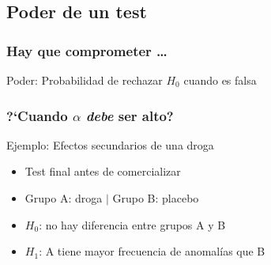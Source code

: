 \documentclass[mathserif]{beamer}
\begin{document}


\subsection[Poder]{Poder de un test}

\begin{frame}[label=power1]
   \frametitle{Hay que comprometer \ldots}
   \begin{beamerboxesrounded}{}
      Poder: Probabilidad de rechazar $H_0$ cuando es falsa
   \end{beamerboxesrounded}
\end{frame}%


\begin{frame}[label=betahigh1]
   \frametitle{?`Cuando $\alpha$ \emph{debe} ser alto?}
   \begin{exampleblock}{Ejemplo: Efectos secundarios de una droga}
      \begin{itemize}
         \item Test final antes de comercializar
         \item Grupo A: droga $|$ Grupo B: placebo
         \item $H_0$: no hay diferencia entre grupos A y B
         \item $H_1$: A tiene mayor frecuencia de anomal\'ias que B
      \end{itemize}
   \end{exampleblock}
\end{frame}%
\end{document}
